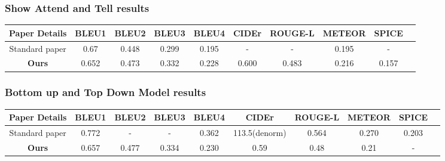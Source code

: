 \documentclass[a4paper]{article}
\begin{document}
\subsubsection{Show Attend and Tell results}
\begin{center}
 \begin{tabular}{|c| c| c| c| c| c| c | c| c| c|} 
 \hline
 
 Paper Details & BLEU1 & BLEU2 & BLEU3 & BLEU4 & CIDEr & ROUGE-L & METEOR & SPICE\\ [0.2ex] 
 \hline
  Standard paper & 0.67 & 0.448 & 0.299 & 0.195 & - & - & 0.195 & - & \\ 
 \hline
\textbf{Ours} & 0.652& 0.473& 0.332& 0.228 & 0.600 &0.483&0.216&0.157&  \\
 \hline

\hline
\end{tabular}
\end{center}
\subsubsection{Bottom up and Top Down Model results}

\begin{center}
 \begin{tabular}{|c| c| c| c| c| c| c | c| c| c|} 
 \hline
 
 Paper Details & BLEU1 & BLEU2 & BLEU3 & BLEU4 & CIDEr & ROUGE-L & METEOR & SPICE\\ [0.2ex] 
 \hline
  Standard paper & 0.772 & - & - & 0.362 & 113.5(denorm) & 0.564 & 0.270 & 0.203& \\ 
 \hline
\textbf{Ours} & 0.657& 0.477& 0.334& 0.230 & 0.59 & 0.48& 0.21& -&  \\
 \hline

\end{tabular}
\end{center}
\end{document}

